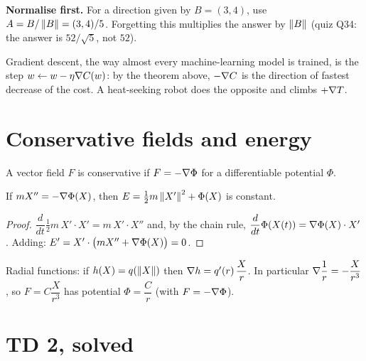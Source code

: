 \begin{trap}
\textbf{Normalise first.} For a direction given by $B=(3,4)$, use $A=B/\left\lVert B\right\rVert=(3,4)/5$.
Forgetting this multiplies the answer by $\left\lVert B\right\rVert$ (quiz Q34: the answer is $52/\sqrt5$,
not $52$).
\end{trap}

\begin{reallife}
Gradient descent, the way almost every machine-learning model is trained, is the step
$w\leftarrow w-\eta\nabla C(w)$: by the theorem above, $-\nabla C$ is the direction of fastest
decrease of the cost. A heat-seeking robot does the opposite and climbs $+\nabla T$.
\end{reallife}

\section{Conservative fields and energy}

\begin{defi}
A vector field $F$ is conservative if $F=-\nabla\Phi$ for a differentiable potential $\Phi$.
\end{defi}

\begin{thm}
If $mX''=-\nabla\Phi(X)$, then $E=\tfrac12m\left\lVert X'\right\rVert^2+\Phi(X)$ is constant.
\end{thm}

\begin{proof}
$\dfrac{d}{dt}\tfrac12m\,X'\cdot X'=m\,X'\cdot X''$ and, by the chain rule,
$\dfrac{d}{dt}\Phi(X(t))=\nabla\Phi(X)\cdot X'$. Adding: $E'=X'\cdot\big(mX''+\nabla\Phi(X)\big)=0$.
\end{proof}

\begin{remember}
Radial functions: if $h(X)=q(\left\lVert X\right\rVert)$ then $\nabla h=q'(r)\,\dfrac{X}{r}$. In particular
$\nabla\dfrac1r=-\dfrac{X}{r^3}$, so $F=C\dfrac{X}{r^3}$ has potential $\Phi=\dfrac Cr$ (with
$F=-\nabla\Phi$).
\end{remember}

\section{TD 2, solved}

